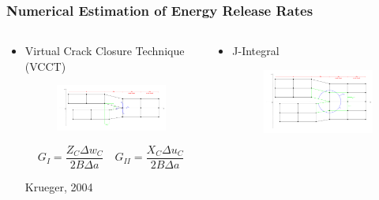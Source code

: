 \documentclass[first,firstsupp,lastsupp,last,hyperref,table]{ETHclass}
\begin{document}
\begin{frame}
\frametitle{\small Numerical Estimation of Energy Release Rates}
\vspace{-0.4cm}
\centering
\scriptsize
\begin{columns}
\begin{column}{0.5\textwidth}
\centering
\vspace*{-1.4cm}
\begin{itemize}[label=]
\item Virtual Crack Closure Technique (VCCT)
\begin{figure}
\includegraphics[width=\columnwidth]{VCCT.pdf}
  \label{fig:vcct}
\end{figure}

\begin{equation*}
G_{I}=\frac{Z_{C}\Delta w_{C}}{2B\Delta a}\quad G_{II}=\frac{X_{C}\Delta u_{C}}{2B\Delta a}
\end{equation*}

Krueger, 2004
\end{itemize}
\end{column}
\begin{column}{0.5\textwidth}
\centering
\begin{itemize}[label=]
\item J-Integral

\begin{figure}
\includegraphics[width=\columnwidth]{J-integral.pdf}
  \label{fig:jintegral}
\end{figure}


\end{itemize}
\end{column}
\end{columns}
\end{frame}
\end{document}
